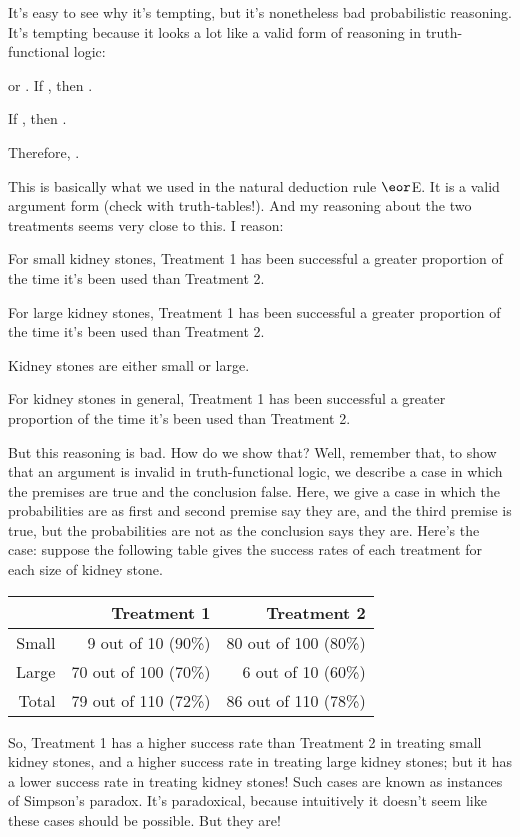It's easy to see why it's tempting, but it's nonetheless bad probabilistic reasoning. It's tempting because it looks a lot like a valid form of reasoning in truth-functional logic:
\begin{earg}
\prem \metaX or \metaY.
\prem If \metaX, then \metaZ.

\prem If \metaY, then \metaZ.

\conc Therefore, \metaZ.
\end{earg}
This is basically what we used in the natural deduction rule $\eor$E. It is a valid argument form (check with truth-tables!). And my reasoning about the two treatments seems very close to this. I reason:
\begin{earg}
\prem For small kidney stones, Treatment 1 has been successful a greater proportion of the time it's been used than Treatment 2.

\prem For large kidney stones, Treatment 1 has been successful a greater proportion of the time it's been used than Treatment 2.

\prem Kidney stones are either small or large.

\conc For kidney stones in general, Treatment 1 has been successful a greater proportion of the time it's been used than Treatment 2.
\end{earg}
But this reasoning is bad. How do we show that? Well, remember that, to show that an argument is invalid in truth-functional logic, we describe a case in which the premises are true and the conclusion false. Here, we give a case in which the probabilities are as first and second premise say they are, and the third premise is true, but the probabilities are not as the conclusion says they are. Here's the case: suppose the following table gives the success rates of each treatment for each size of kidney stone.
\begin{center}
\begin{tabular}{r|r|r}
& Treatment 1 & Treatment 2 \\
\hline
Small & 9 out of 10 (90\%) & 80 out of 100 (80\%) \\
Large & 70 out of 100 (70\%) & 6 out of 10 (60\%) \\
\hline
Total & 79 out of 110 (72\%) & 86 out of 110 (78\%)
\end{tabular}
\end{center}
So, Treatment 1 has a higher success rate than Treatment 2 in treating small kidney stones, and a higher success rate in treating large kidney stones; but it has a lower success rate in treating kidney stones! Such cases are known as instances of Simpson's paradox. It's paradoxical, because intuitively it doesn't seem like these cases should be possible. But they are!

